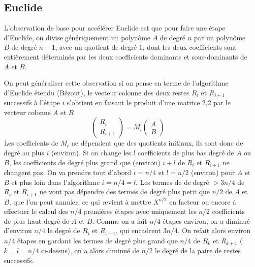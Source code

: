 \documentclass[a4paper,11pt]{book}
\begin{document}
\begin{giacjshere}
\subsection{Euclide}
L'observation de base pour acc\'el\'erer Euclide est que pour faire une
\'etape d'Euclide, on divise g\'en\'eriquement un polyn\^ome $A$ de degr\'e
$n$ par un polyn\^ome $B$ de degr\'e $n-1$, avec un quotient de degr\'e 1,
dont les deux coefficients sont enti\`erement d\'etermin\'es par les
deux coefficients dominants et sous-dominants de $A$ et $B$.

On peut g\'en\'eraliser cette observation si on pense en terme
de l'algorithme d'Euclide \'etendu (B\'ezout), le vecteur colonne 
des deux restes $R_i$ et $R_{i+1}$ successifs \`a l'\'etape
$i$ s'obtient en faisant
le produit d'une matrice 2,2 par le vecteur colonne $A$ et $B$
$$ \begin{pmatrix} R_i \\ R_{i+1} \end{pmatrix}
= M_i \begin{pmatrix} A \\ B \end{pmatrix} $$
Les coefficients de $M_i$ ne d\'ependent
que des quotients initiaux, ils sont donc de degr\'e au plus $i$ (environ).
Si on change les $l$ coefficients de plus bas degr\'e de $A$ ou $B$,
les coefficients de degr\'e plus grand que (environ)
$i+l$ de $R_i$ et $R_{i+1}$ ne changent pas. 
On va prendre tout d'abord $i=n/4$ et $l=n/2$ (environ) pour $A$ et $B$
et plus loin dans l'algorithme $i=n/4=l$. 
Les termes de de degr\'e $>3n/4$ de $R_i$ et $R_{i+1}$ ne 
vont pas d\'ependre des termes de degr\'e plus petit que $n/2$ de $A$ et $B$,
que l'on peut annuler, ce qui revient \`a mettre $X^{n/2}$ en facteur
ou encore \`a effectuer le calcul des $n/4$ premi\`eres \'etapes
avec uniquement les $n/2$ coefficients de plus haut degr\'e de $A$ et $B$.
Comme on a fait $n/4$ \'etapes environ, on a diminu\'e d'environ $n/4$
le degr\'e de $R_i$ et $R_{i+1}$, qui encadrent $3n/4$.
On refait alors environ $n/4$ \'etapes en gardant les termes de degr\'e
plus grand que $n/4$ de $R_k$ et $R_{k+1}$ ($k=l=n/4$ ci-dessus), 
on a alors diminu\'e de $n/2$
le degr\'e de la paire de restes successifs.


\end{giacjshere}
\end{document}
